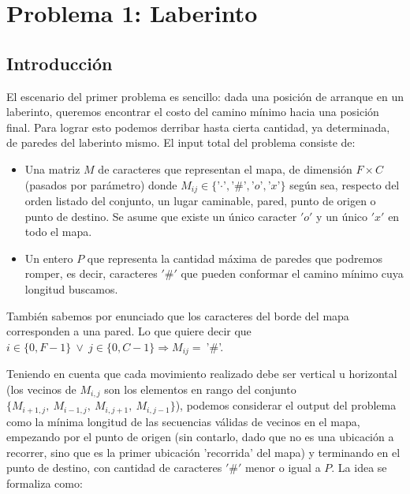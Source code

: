 \section{Problema 1: Laberinto}
\subsection{Introducción}

El escenario del primer problema es sencillo: dada una posición de arranque en un laberinto, queremos encontrar el costo del camino mínimo hacia una posición final. Para lograr esto podemos derribar hasta cierta cantidad, ya determinada, de paredes del laberinto mismo. El input total del problema consiste de:

    \begin{itemize}
        \item Una matriz $M$ de caracteres que representan el mapa, de dimensión $F\times C$ (pasados por parámetro) donde $M_{ij} \in \{$'$\cdotp$'$,$'$\#$'$,$'$o$'$,$'$x$'$\}$ según sea, respecto del orden listado del conjunto, un lugar caminable, pared, punto de origen o punto de destino. Se asume que existe un único caracter $'o'$ y un único $'x'$ en todo el mapa.
        \item Un entero $P$ que representa la cantidad máxima de paredes que podremos romper, es decir, caracteres $'\#'$ que pueden conformar el camino mínimo cuya longitud buscamos.
    \end{itemize}

También sabemos por enunciado que los caracteres del borde del mapa corresponden a una pared. Lo que quiere decir que $i \in \{0, F-1\} \ \vee \ j \in \{0, C-1\} \Rightarrow M_{ij} =\ $'$\#$'.

Teniendo en cuenta que cada movimiento realizado debe ser vertical u horizontal (los vecinos de $M_{i,j}$ son los elementos en rango del conjunto $\{M_{i+1,j},\ M_{i-1,j},\ M_{i,j+1},\ M_{i,j-1}\}$), podemos considerar el output del problema como la mínima longitud de las secuencias válidas de vecinos en el mapa, empezando por el punto de origen (sin contarlo, dado que no es una ubicación a recorrer, sino que es la primer ubicación 'recorrida' del mapa) y terminando en el punto de destino, con cantidad de caracteres $'\#'$ menor o igual a $P$. La idea se formaliza como:
\\

